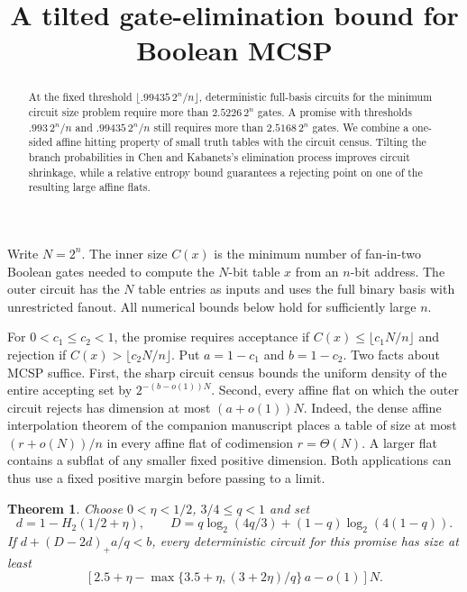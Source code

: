 \documentclass[11pt]{article}
\title{A tilted gate-elimination bound for Boolean MCSP}
\author{}\date{}
\newtheorem{theorem}{Theorem}
\begin{document}
\maketitle
\begin{abstract}
At the fixed threshold $\lfloor .99435\,2^n/n\rfloor$, deterministic full-basis circuits for the minimum circuit size problem require more than $2.5226\,2^n$ gates. A promise with thresholds $.993\,2^n/n$ and $.99435\,2^n/n$ still requires more than $2.5168\,2^n$ gates. We combine a one-sided affine hitting property of small truth tables with the circuit census. Tilting the branch probabilities in Chen and Kabanets's elimination process improves circuit shrinkage, while a relative entropy bound guarantees a rejecting point on one of the resulting large affine flats.
\end{abstract}

Write $N=2^n$. The inner size $C(x)$ is the minimum number of fan-in-two Boolean gates needed to compute the $N$-bit table $x$ from an $n$-bit address. The outer circuit has the $N$ table entries as inputs and uses the full binary basis with unrestricted fanout. All numerical bounds below hold for sufficiently large $n$.

For $0<c_1\le c_2<1$, the promise requires acceptance if $C(x)\le\lfloor c_1N/n\rfloor$ and rejection if $C(x)>\lfloor c_2N/n\rfloor$. Put $a=1-c_1$ and $b=1-c_2$. Two facts about MCSP suffice. First, the sharp circuit census bounds the uniform density of the entire accepting set by $2^{-(b-o(1))N}$. Second, every affine flat on which the outer circuit rejects has dimension at most $(a+o(1))N$. Indeed, the dense affine interpolation theorem of the companion manuscript \cite{local} places a table of size at most $(r+o(N))/n$ in every affine flat of codimension $r=\Theta(N)$. A larger flat contains a subflat of any smaller fixed positive dimension. Both applications can thus use a fixed positive margin before passing to a limit.

\begin{theorem}
Choose $0<\eta<1/2$, $3/4\le q<1$ and set
\[
 d=1-H_2(1/2+\eta),\qquad
 D=q\log_2(4q/3)+(1-q)\log_2(4(1-q)).
\]
If $d+(D-2d)_+a/q<b$, every deterministic circuit for this promise has size at least
\[
 \left[2.5+\eta-\max\{3.5+\eta,(3+2\eta)/q\}\,a-o(1)\right]N .
\]
\end{theorem}
\end{document}
